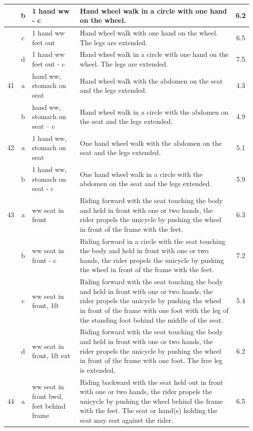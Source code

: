 \begin{longtable}{|r|c|p{4cm}|p{8cm}|c|}
\hline
  & b & 1 hand ww - c & Hand wheel walk in a circle with one hand on the wheel. & 6.2 \\ 
\hline
  & c & 1 hand ww feet out  & Hand wheel walk with one hand on the wheel. The legs are extended.  & 6.5 \\ 
\hline
  & d & 1 hand ww feet out - c  & Hand wheel walk in a circle with one hand on the wheel. The legs are extended.  & 7.5 \\ 
\hline
41  & a & hand ww, stomach on seat  & Hand wheel walk with the abdomen on the seat and the legs extended. & 4.3 \\ 
\hline
  & b & hand ww, stomach on seat – c  & Hand wheel walk in a circle with the abdomen on the seat and the legs extended. & 4.9 \\ 
\hline
42  & a & 1 hand ww, stomach on seat  & One hand wheel walk with the abdomen on the seat and the legs extended. & 5.1 \\ 
\hline
  & b & 1 hand ww, stomach on seat - c  & One hand wheel walk in a circle with the abdomen on the seat and the legs extended. & 5.9 \\ 
\hline
43  & a & ww seat in front  & Riding forward with the seat touching the body and held in front with one or two hands, the rider propels the unicycle by pushing the wheel in front of the frame with the feet.  & 6.3 \\ 
\hline
  & b & ww seat in front - c  & Riding forward in a circle with the seat touching the body and held in front with one or two hands, the rider propels the unicycle by pushing the wheel in front of the frame with the feet.  & 7.2 \\ 
\hline
  & c & ww seat in front, 1ft & Riding forward with the seat touching the body and held in front with one or two hands, the rider propels the unicycle by pushing the wheel in front of the frame with one foot with the leg of the standing foot behind the middle of the seat.  & 5.4 \\ 
\hline
  & d & ww seat in front, 1ft ext & Riding forward with the seat touching the body and held in front with one or two hands, the rider propels the unicycle by pushing the wheel in front of the frame with one foot. The free leg is extended.  & 6.2 \\ 
\hline
44  & a & ww seat in front bwd, feet behind frame & Riding backward with the seat held out in front with one or two hands, the rider propels the unicycle by pushing the wheel behind the frame with the feet. The seat or hand(s) holding the seat may rest against the rider. & 6.5 \\ 

\end{longtable}
